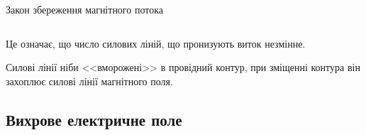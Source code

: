 \documentclass[onlytextwidth]{beamer}
\begin{document}
\begin{frame}{Закон збереження магнітного потока}{}
\begin{columns}
\begin{column}{0.8\linewidth}
\begin{block}{}
			\end{block}
		\end{column}
	\end{columns}
	\begin{block}{}\justifying
		Це означає, що \alert{число силових ліній, що пронизують виток незмінне}.

		\smallskip

		Силові лінії ніби <<вморожені>> в провідний контур, при зміщенні контура він захоплює силові лінії магнітного поля.
	\end{block}
\end{frame}




\subsection{Вихрове електричне поле}
\end{document}
